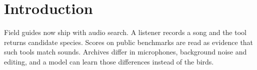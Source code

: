 \begin{abstract}
Song libraries are searched by people who need to name a bird from a field recording. We ask whether retrieval scores on such a library measure matching sounds to species or only matching recordings to the archive they came from. We built a small benchmark of forty recordings and tested three audio models against a baseline that sees only the archive label. One model beat that baseline, and only on a minority of queries.
\end{abstract}
\section{Introduction}
Field guides now ship with audio search. A listener records a song and the tool returns candidate species. Scores on public benchmarks are read as evidence that such tools match sounds. Archives differ in microphones, background noise and editing, and a model can learn those differences instead of the birds.
